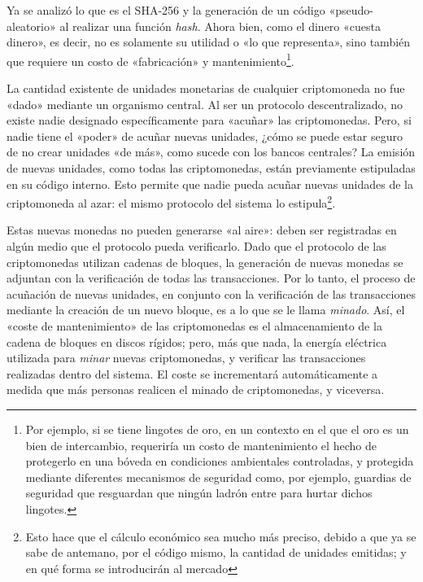 \documentclass[12pt,a4paper,twoside]{book}
\begin{document}
Ya se analizó lo que es el SHA-256 y la generación de un código «pseudo-aleatorio» al realizar una función \textit{hash}. Ahora bien, como el dinero «cuesta dinero», es decir, no es solamente su utilidad o «lo que representa», sino también que requiere un costo de  «fabricación» y mantenimiento\footnote{Por ejemplo, si se tiene lingotes de oro, en un contexto en el que el oro es un bien de intercambio, requeriría un costo de mantenimiento el hecho de protegerlo en una bóveda en condiciones ambientales controladas, y protegida mediante diferentes mecanismos de seguridad como, por ejemplo, guardias de seguridad que resguardan que ningún ladrón entre para hurtar dichos lingotes.}. 

La cantidad existente de unidades monetarias de cualquier criptomoneda no fue «dado» mediante un organismo central. Al ser un protocolo descentralizado, no existe nadie designado específicamente para «acuñar» las criptomonedas. Pero, si nadie tiene el «poder» de acuñar nuevas unidades, ¿cómo se puede estar seguro de no crear unidades «de más», como sucede con los bancos centrales? La emisión de nuevas unidades, como todas las criptomonedas, están previamente estipuladas en su código interno. Esto permite que nadie pueda acuñar nuevas unidades de la criptomoneda al azar: el mismo protocolo del sistema lo estipula\footnote{Esto hace que el cálculo económico sea mucho más preciso, debido a que ya se sabe de antemano, por el código mismo, la cantidad de unidades emitidas; y en qué forma se introducirán al mercado}.

Estas nuevas monedas no pueden generarse «al aire»: deben ser registradas en algún medio que el protocolo pueda verificarlo. Dado que el protocolo de las criptomonedas utilizan cadenas de bloques, la generación de nuevas monedas se adjuntan con la verificación de todas las transacciones. Por lo tanto, el proceso de acuñación de nuevas unidades, en conjunto con la verificación de las transacciones mediante la creación de un nuevo bloque, es a lo que se le llama \textit{minado}. Así, el «coste de mantenimiento» de las criptomonedas es el almacenamiento de la cadena de bloques en discos rígidos; pero, más que nada, la energía eléctrica utilizada para \textit{minar} nuevas criptomonedas, y verificar las transacciones realizadas dentro del sistema. El coste se incrementará automáticamente a medida que más personas realicen el minado de criptomonedas, y viceversa.
\end{document}
